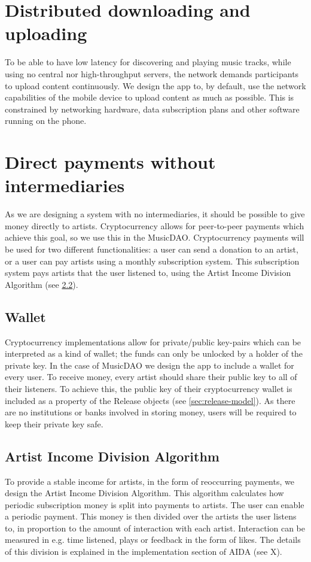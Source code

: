\section{Distributed downloading and uploading}
To be able to have low latency for discovering and playing music tracks, while using no central nor high-throughput servers, the network demands participants to upload content continuously. We design the app to, by default, use the network capabilities of the mobile device to upload content as much as possible. This is constrained by networking hardware, data subscription plans and other software running on the phone.

\section{Direct payments without intermediaries}
As we are designing a system with no intermediaries, it should be possible to give money directly to artists. Cryptocurrency allows for peer-to-peer payments which achieve this goal, so we use this in the MusicDAO. Cryptocurrency payments will be used for two different functionalities: a user can send a donation to an artist, or a user can pay artists using a monthly subscription system. This subscription system pays artists that the user listened to, using the Artist Income Division Algorithm (see \ref{sec:aida-design}).

\subsection{Wallet}
Cryptocurrency implementations allow for private/public key-pairs which can be interpreted as a kind of wallet; the funds can only be unlocked by a holder of the private key. In the case of MusicDAO we design the app to include a wallet for every user. To receive money, every artist should share their public key to all of their listeners. To achieve this, the public key of their cryptocurrency wallet is included as a property of the Release objects (see \ref{sec:release-model}). As there are no institutions or banks involved in storing money, users will be required to keep their private key safe.

\subsection{Artist Income Division Algorithm}
\label{sec:aida-design}
To provide a stable income for artists, in the form of reoccurring payments, we design the Artist Income Division Algorithm. This algorithm calculates how periodic subscription money is split into payments to artists. The user can enable a periodic payment. This money is then divided over the artists the user listens to, in proportion to the amount of interaction with each artist. Interaction can be measured in e.g. time listened, plays or feedback in the form of likes. The details of this division is explained in the implementation section of AIDA (see X).
